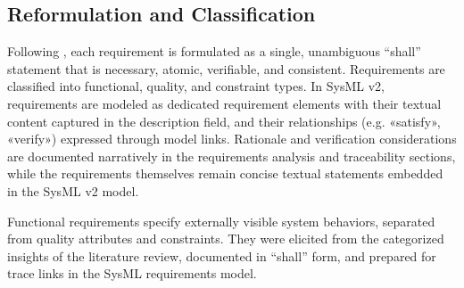 \subsection{Reformulation and Classification}\label{subsec:req-clas}
Following \textcite{glinzHandbook2020}, each requirement is formulated as a single, unambiguous “shall” statement that is necessary, atomic, verifiable, and consistent. Requirements are classified into functional, quality, and constraint types. In SysML v2, requirements are modeled as dedicated requirement elements with their textual content captured in the description field, and their relationships (e.g. «satisfy», «verify») expressed through model links. Rationale and verification considerations are documented narratively in the requirements analysis and traceability sections, while the requirements themselves remain concise textual statements embedded in the SysML v2 model.

Functional requirements specify externally visible system behaviors, separated from quality attributes and constraints. They were elicited from the categorized insights of the literature review, documented in “shall” form, and prepared for trace links in the SysML requirements model. \\

